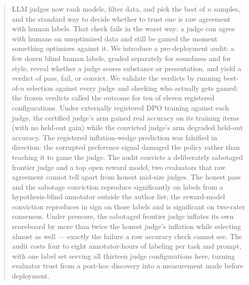 \begin{abstract}
LLM judges now rank models, filter data, and pick the best of $n$ samples, and the standard way to decide whether to trust one is raw agreement with human labels.
That check fails in the worst way: a judge can agree with humans on unoptimized data and still be gamed the moment something optimizes against it.
We introduce a pre-deployment audit: a few dozen blind human labels, graded separately for soundness and for style, reveal whether a judge scores substance or presentation, and yield a verdict of pass, fail, or convict.
We validate the verdicts by running best-of-$n$ selection against every judge and checking who actually gets gamed: the frozen verdicts called the outcome for ten of eleven registered configurations.
Under externally registered DPO training against each judge, the certified judge's arm gained real accuracy on its training items (with no held-out gain) while the convicted judge's arm degraded held-out accuracy.
The registered inflation-wedge prediction was falsified in direction: the corrupted preference signal damaged the policy rather than teaching it to game the judge.
The audit convicts a deliberately sabotaged frontier judge and a top open reward model, two evaluators that raw agreement cannot tell apart from honest mid-size judges.
The honest pass and the sabotage conviction reproduce significantly on labels from a hypothesis-blind annotator outside the author list; the reward-model conviction reproduces in sign on those labels and is significant on two-rater consensus.
Under pressure, the sabotaged frontier judge inflates its own scoreboard by more than twice the honest judge's inflation while selecting almost as well --- exactly the failure a raw accuracy check cannot see.
The audit costs four to eight annotator-hours of labeling per task and prompt, with one label set serving all thirteen judge configurations here, turning evaluator trust from a post-hoc discovery into a measurement made before deployment.
\end{abstract}
